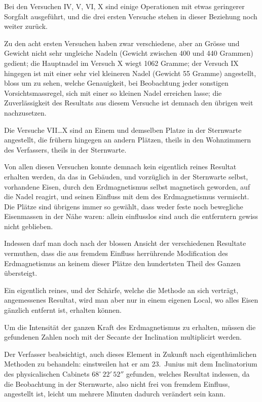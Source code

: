 \documentclass[12pt,a4paper]{article}
\begin{document}
Bei den Versuchen IV, V, VI, X sind einige Operationen mit etwas geringerer Sorgfalt ausgeführt, und die drei ersten Versuche stehen in dieser Beziehung noch weiter zurück.

Zu den acht ersten Versuchen haben zwar verschiedene, aber an Grösse und Gewicht nicht sehr ungleiche Nadeln (Gewicht zwischen 400 und 440 Grammen) gedient; die Hauptnadel im Versuch X wiegt 1062 Gramme; der Versuch IX hingegen ist mit einer sehr viel kleineren Nadel (Gewicht 55 Gramme) angestellt, bloss um zu sehen, welche Genauigkeit, bei Beobachtung jeder sonstigen Vorsichtsmassregel, sich mit einer so kleinen Nadel erreichen lasse; die Zuverlässigkeit des Resultats aus diesem Versuche ist demnach den übrigen weit nachzusetzen.

\bigskip

Die Versuche VII\dots{}X sind an Einem und demselben Platze in der Sternwarte angestellt, die frühern hingegen an andern Plätzen, theils in den Wohnzimmern des Verfassers, theils in der Sternwarte.

Von allen diesen Versuchen konnte demnach kein eigentlich reines Resultat erhalten werden, da das in Gebäuden, und vorzüglich in der Sternwarte selbst, vorhandene Eisen, durch den Erdmagnetismus selbst magnetisch geworden, auf die Nadel reagirt, und seinen Einfluss mit dem des Erdmagnetismus vermischt. Die Plätze sind übrigens immer so gewählt, dass weder feste noch bewegliche Eisenmassen in der Nähe waren: allein einflusslos sind auch die entferntern gewiss nicht geblieben.

Indessen darf man doch nach der blossen Ansicht der verschiedenen Resultate vermuthen, dass die aus fremdem Einfluss herrührende Modification des Erdmagnetismus an keinem dieser Plätze den hundertsten Theil des Ganzen übersteigt.

Ein eigentlich reines, und der Schärfe, welche die Methode an sich verträgt, angemessenes Resultat, wird man aber nur in einem eigenen Local, wo alles Eisen gänzlich entfernt ist, erhalten können.

Um die Intensität der ganzen Kraft des Erdmagnetismus zu erhalten, müssen die gefundenen Zahlen noch mit der Secante der Inclination multiplicirt werden.

Der Verfasser beabsichtigt, auch dieses Element in Zukunft nach eigenthümlichen Methoden zu behandeln: einstweilen hat er am 23.~Junius mit dem Inclinatorium des physicalischen Cabinets $68^\circ\,22'\,52''$ gefunden, welches Resultat indessen, da die Beobachtung in der Sternwarte, also nicht frei von fremdem Einfluss, angestellt ist, leicht um mehrere Minuten dadurch verändert sein kann.
\end{document}
